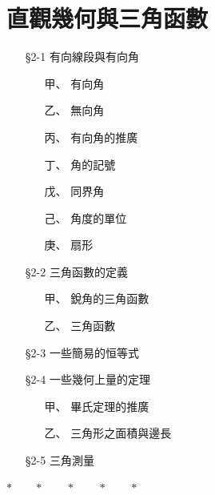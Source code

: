 
\section{直觀幾何與三角函數}
\label{sec:b3s-ch2}

\begin{center}
\begin{minipage}{0.65\textwidth}
\begin{itemize}[leftmargin=2em, itemsep=0.3em]
  \item[§2-1] 有向線段與有向角
  \begin{itemize}[leftmargin=2em, itemsep=0.2em]
    \item[甲、] 有向角
    \item[乙、] 無向角
    \item[丙、] 有向角的推廣
    \item[丁、] 角的記號
    \item[戊、] 同界角
    \item[己、] 角度的單位
    \item[庚、] 扇形
  \end{itemize}
  \item[§2-2] 三角函數的定義
  \begin{itemize}[leftmargin=2em, itemsep=0.2em]
    \item[甲、] 銳角的三角函數
    \item[乙、] 三角函數
  \end{itemize}
  \item[§2-3] 一些簡易的恒等式
  \item[§2-4] 一些幾何上量的定理
  \begin{itemize}[leftmargin=2em, itemsep=0.2em]
    \item[甲、] 畢氏定理的推廣
    \item[乙、] 三角形之面積與邊長
  \end{itemize}
  \item[§2-5] 三角測量
\end{itemize}
\end{minipage}
\end{center}

\begin{center}
$* \qquad * \qquad * \qquad * \qquad *$
\end{center}

